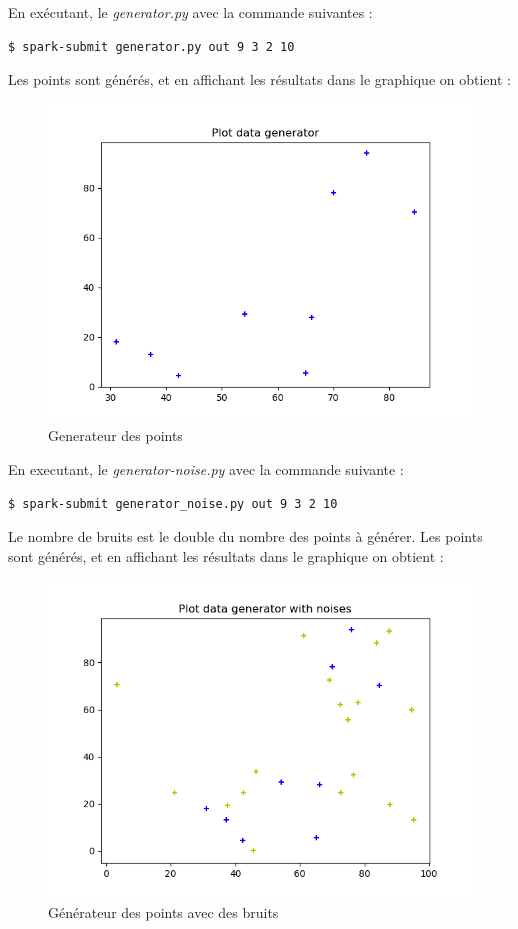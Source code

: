 \documentclass[french]{article}
\begin{document}
\newpage
\noindent En exécutant, le \textit{generator.py} avec la commande suivantes :
\begin{lstlisting}[language=bash]
$ spark-submit generator.py out 9 3 2 10
\end{lstlisting}
Les points sont générés, et en affichant les résultats dans le graphique on obtient :
\begin{figure}[h!]
\centering
\includegraphics[width=\linewidth]{img/generator-points.png}
\caption{Generateur des points}
\end{figure}

\newpage
\noindent En executant, le \textit{generator-noise.py} avec la commande suivante :
\begin{lstlisting}[language=bash]
$ spark-submit generator_noise.py out 9 3 2 10
\end{lstlisting}
Le nombre de bruits est le double du nombre des points à générer.
Les points sont générés, et en affichant les résultats dans le graphique on obtient :
\begin{figure}[h!]
\centering
\includegraphics[width=\linewidth]{img/generator-noises.png}
\caption{Générateur des points avec des bruits}
\end{figure}
\end{document}

